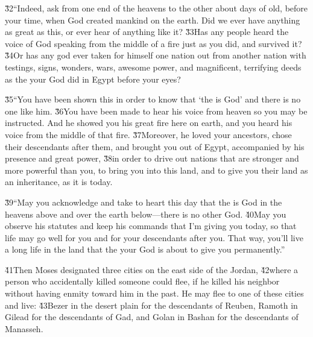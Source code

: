 \v{32}``Indeed, ask from one end of the heavens to the other about days of old, before your time, when God created mankind on the earth. Did we ever have anything as great as this, or ever hear of anything like it? \v{33}Has any people heard the voice of God speaking from the middle of a fire just as you did, and survived it? \v{34}Or has any god ever taken for himself one nation out from another nation with testings, signs, wonders, wars, awesome power, and magnificent, terrifying deeds as the  your God did in Egypt before your eyes?

\v{35}``You have been shown this in order to know that `the  is God' and there is no one like him. \v{36}You have been made to hear his voice from heaven so you may be instructed. And he showed you his great fire here on earth, and you heard his voice from the middle of that fire. \v{37}Moreover, he loved your ancestors, chose their descendants after them, and brought you out of Egypt, accompanied by his presence and great power, \v{38}in order to drive out nations that are stronger and more powerful than you, to bring you into this land, and to give you their land as an inheritance, as it is today.

\v{39}``May you acknowledge and take to heart this day that the  is God in the heavens above and over the earth below---there is no other God. \v{40}May you observe his statutes and keep his commands that I'm giving you today, so that life may go well for you and for your descendants after you. That way, you'll live a long life in the land that the  your God is about to give you permanently.''

\v{41}Then Moses designated three cities on the east side of the Jordan, \v{42}where a person who accidentally killed someone could flee, if he killed his neighbor without having enmity toward him in the past. He may flee to one of these cities and live: \v{43}Bezer in the desert plain for the descendants of Reuben, Ramoth in Gilead for the descendants of Gad, and Golan in Bashan for the descendants of Manasseh.

